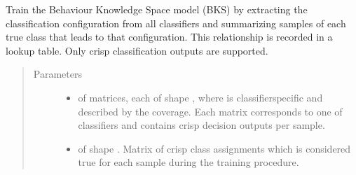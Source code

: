 \documentclass[letterpaper,10pt,english]{sphinxmanual}
\begin{document}
\begin{fulllineitems}
\begin{fulllineitems}
\label{\detokenize{pusion.core.behaviour_knowledge_space_combiner:pusion.core.behaviour_knowledge_space_combiner.CRBehaviourKnowledgeSpaceCombiner.train}}
\sphinxAtStartPar
Train the Behaviour Knowledge Space model (BKS) by extracting the classification configuration from all
classifiers and summarizing samples of each true class that leads to that configuration. This relationship is
recorded in a lookup table. Only crisp classification outputs are supported.
\begin{quote}\begin{description}
\item[{Parameters}] \leavevmode\begin{itemize}
\item {} 
\sphinxAtStartPar
{} \textendash{}  of  matrices, each of shape ,
where  is classifier\sphinxhyphen{}specific and described by the coverage.
Each matrix corresponds to one of  classifiers and contains crisp decision outputs
per sample.

\item {} 
\sphinxAtStartPar
{} \textendash{}  of shape .
Matrix of crisp class assignments which is considered true for each sample during
the training procedure.

\end{itemize}

\end{description}\end{quote}

\end{fulllineitems}



\end{fulllineitems}
\end{document}
